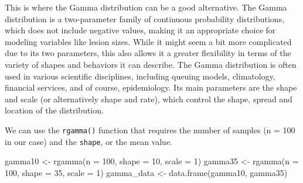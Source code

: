 \documentclass[
  letterpaper,
]{book}
\newenvironment{Shaded}{\begin{snugshade}}{\end{snugshade}}
\newcommand{\AttributeTok}[1]{\textcolor[rgb]{0.40,0.45,0.13}{#1}}
\newcommand{\DecValTok}[1]{\textcolor[rgb]{0.68,0.00,0.00}{#1}}
\newcommand{\FunctionTok}[1]{\textcolor[rgb]{0.28,0.35,0.67}{#1}}
\newcommand{\NormalTok}[1]{\textcolor[rgb]{0.00,0.23,0.31}{#1}}
\newcommand{\OtherTok}[1]{\textcolor[rgb]{0.00,0.23,0.31}{#1}}
\newcommand{\SpecialCharTok}[1]{\textcolor[rgb]{0.37,0.37,0.37}{#1}}
\newcommand{\StringTok}[1]{\textcolor[rgb]{0.13,0.47,0.30}{#1}}
\begin{document}
This is where the Gamma distribution can be a good alternative. The
Gamma distribution is a two-parameter family of continuous probability
distributions, which does not include negative values, making it an
appropriate choice for modeling variables like lesion sizes. While it
might seem a bit more complicated due to its two parameters, this also
allows it a greater flexibility in terms of the variety of shapes and
behaviors it can describe. The Gamma distribution is often used in
various scientific disciplines, including queuing models, climatology,
financial services, and of course, epidemiology. Its main parameters are
the shape and scale (or alternatively shape and rate), which control the
shape, spread and location of the distribution.

We can use the \texttt{rgamma()} function that requires the number of
samples (n = 100 in our case) and the \texttt{shape}, or the mean value.

\begin{Shaded}
\begin{Highlighting}[]
\NormalTok{gamma10 }\OtherTok{\textless{}{-}} \FunctionTok{rgamma}\NormalTok{(}\AttributeTok{n =} \DecValTok{100}\NormalTok{, }\AttributeTok{shape =} \DecValTok{10}\NormalTok{, }\AttributeTok{scale =} \DecValTok{1}\NormalTok{)}
\NormalTok{gamma35 }\OtherTok{\textless{}{-}} \FunctionTok{rgamma}\NormalTok{(}\AttributeTok{n =} \DecValTok{100}\NormalTok{, }\AttributeTok{shape =} \DecValTok{35}\NormalTok{, }\AttributeTok{scale =} \DecValTok{1}\NormalTok{)}
\NormalTok{gamma\_data }\OtherTok{\textless{}{-}} \FunctionTok{data.frame}\NormalTok{(gamma10, gamma35)}
\end{Highlighting}
\end{Shaded}

\begin{Shaded}
\end{Shaded}
\end{document}

